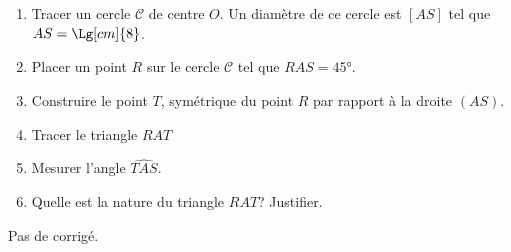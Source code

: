 \begin{exercice*}
   \begin{enumerate}
      \item Tracer un cercle $\mathcal{C}$ de centre $O$. Un diamètre de ce cercle est $[AS]$ tel que $AS = \Lg[cm]{8}$.
      \item Placer un point $R$ sur le cercle $\mathcal{C}$ tel que
$\widehat{RAS} = \ang{45}$.
      \item Construire le point $T$, symétrique du point $R$ par rapport à la droite $(AS)$.
      \item Tracer le triangle $RAT$
      \item Mesurer l'angle $\widehat{TAS}$.
      \item Quelle est la nature du triangle $RAT$? Justifier.
   \end{enumerate}
\end{exercice*}
\begin{corrige}
   Pas de corrigé.
\end{corrige}
